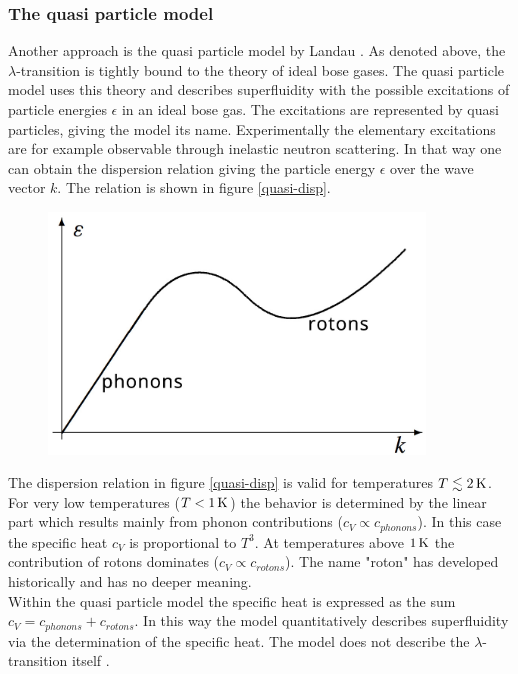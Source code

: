 \documentclass[parskip,12pt,headsepline,a4paper] {scrbook}
\begin{document}
\subsubsection{The quasi particle model}
\vspace{-1\baselineskip}
Another approach is the quasi particle model by Landau \cite{landau}. As denoted above, the $\lambda$-transition is tightly bound to the theory of ideal bose gases. The quasi particle model uses this theory and describes superfluidity with the possible excitations of particle energies $\epsilon$ in an ideal bose gas. The excitations are represented by quasi particles, giving the model its name. Experimentally the elementary excitations are for example observable through inelastic neutron scattering. In that way one can obtain the dispersion relation giving the particle energy $\epsilon$ over the wave vector $k$. The relation is shown in figure \ref{quasi-disp}.

\begin{figure}[ht]
\centerline{
\includegraphics[width=10cm]{./helium/DispRel.jpg}}
\end{figure}

The dispersion relation in figure \ref{quasi-disp} is valid for temperatures $T \lesssim \unit[2]{K}$. For very low temperatures ($T < \unit[1]{K}$) the behavior is determined by the linear part which results mainly from phonon contributions ($c_V \propto c_{phonons}$). In this case the specific heat $c_V$ is proportional to $T^3$. At temperatures above $\unit[1]{K}$ the contribution of rotons dominates ($c_V \propto c_{rotons}$). The name "roton" has developed historically and has no deeper meaning. \\
Within the quasi particle model the specific heat is expressed as the sum $c_V = c_{phonons} + c_{rotons}$. In this way the model quantitatively describes superfluidity via the determination of the specific heat. The model does not describe the $\lambda$-transition itself \cite{fliessbach}.
\end{document}
